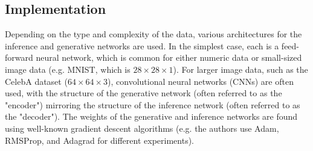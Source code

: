 \subsection{Implementation}

Depending on the type and complexity of the data, various architectures for the inference and generative networks are used. In the simplest case, each is a feed-forward neural network, which is common for either numeric data or small-sized image data (e.g. MNIST, which is $28\times28\times1$). For larger image data, such as the CelebA dataset ($64\times64\times3$), convolutional neural networks (CNNs) are often used, with the structure of the generative network (often referred to as the "encoder") mirroring the structure of the inference network (often referred to as the "decoder"). The weights of the generative and inference networks are found using well-known gradient descent algorithms (e.g. the authors use Adam, RMSProp, and Adagrad for different experiments).